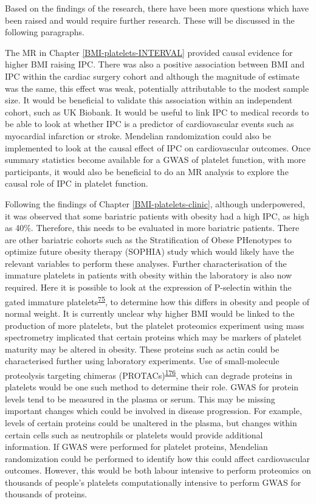 \documentclass[11pt,twoside]{bristolthesis}
\begin{document}
Based on the findings of the research, there have been more questions which have been raised and would require further research. These will be discussed in the following paragraphs.

The MR in Chapter \ref{BMI-platelets-INTERVAL} provided causal evidence for higher BMI raising IPC. There was also a positive association between BMI and IPC within the cardiac surgery cohort and although the magnitude of estimate was the same, this effect was weak, potentially attributable to the modest sample size. It would be beneficial to validate this association within an independent cohort, such as UK Biobank. It would be useful to link IPC to medical records to be able to look at whether IPC is a predictor of cardiovascular events such as myocardial infarction or stroke. Mendelian randomization could also be implemented to look at the causal effect of IPC on cardiovascular outcomes. Once summary statistics become available for a GWAS of platelet function, with more participants, it would also be beneficial to do an MR analysis to explore the causal role of IPC in platelet function.

Following the findings of Chapter \ref{BMI-platelets-clinic}, although underpowered, it was observed that some bariatric patients with obesity had a high IPC, as high as 40\%. Therefore, this needs to be evaluated in more bariatric patients. There are other bariatric cohorts such as the Stratification of Obese PHenotypes to optimize future obesity therapy (SOPHIA) study which would likely have the relevant variables to perform these analyses. Further characterisation of the immature platelets in patients with obesity within the laboratory is also now required. Here it is possible to look at the expression of P-selectin within the gated immature platelets\textsuperscript{\protect\hyperlink{ref-Bernlochner2015a}{75}}, to determine how this differs in obesity and people of normal weight. It is currently unclear why higher BMI would be linked to the production of more platelets, but the platelet proteomics experiment using mass spectrometry implicated that certain proteins which may be markers of platelet maturity may be altered in obesity. These proteins such as actin could be characterised further using laboratory experiments. Use of small-molecule proteolysis targeting chimeras (PROTACs)\textsuperscript{\protect\hyperlink{ref-Sledz2020}{176}}, which can degrade proteins in platelets would be one such method to determine their role. GWAS for protein levels tend to be measured in the plasma or serum. This may be missing important changes which could be involved in disease progression. For example, levels of certain proteins could be unaltered in the plasma, but changes within certain cells such as neutrophils or platelets would provide additional information. If GWAS were performed for platelet proteins, Mendelian randomization could be performed to identify how this could affect cardiovascular outcomes. However, this would be both labour intensive to perform proteomics on thousands of people's platelets computationally intensive to perform GWAS for thousands of proteins.
\end{document}
